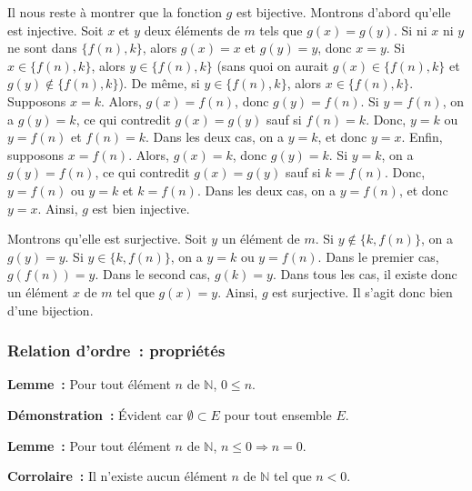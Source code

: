     Il nous reste à montrer que la fonction $g$ est bijective. 
    Montrons d'abord qu'elle est injective. 
    Soit $x$ et $y$ deux éléments de $m$ tels que $g(x) = g(y)$.
    Si ni $x$ ni $y$ ne sont dans $\lbrace f(n), k \rbrace$, alors $g(x) = x$ et $g(y) = y$, donc $x=y$. 
    Si $x \in \lbrace f(n), k \rbrace$, alors $y \in \lbrace f(n), k \rbrace$ (sans quoi on aurait $g(x) \in \lbrace f(n), k \rbrace$ et $g(y) \notin \lbrace f(n), k \rbrace$). 
    De même, si $y \in \lbrace f(n), k \rbrace$, alors $x \in \lbrace f(n), k \rbrace$. 
    Supposons $x = k$. 
    Alors, $g(x) = f(n)$, donc $g(y) = f(n)$. 
    Si $y = f(n)$, on a $g(y) = k$, ce qui contredit $g(x) = g(y)$ sauf si $f(n) = k$. 
    Donc, $y = k$ ou $y = f(n)$ et $f(n) = k$. 
    Dans les deux cas, on a $y = k$, et donc $y = x$. 
    Enfin, supposons $x = f(n)$. 
    Alors, $g(x) = k$, donc $g(y) = k$. 
    Si $y = k$, on a $g(y) = f(n)$, ce qui contredit $g(x) = g(y)$ sauf si $k = f(n)$. 
    Donc, $y = f(n)$ ou $y = k$ et $k = f(n)$. 
    Dans les deux cas, on a $y = f(n)$, et donc $y = x$. 
    Ainsi, $g$ est bien injective. 

    Montrons qu'elle est surjective. 
    Soit $y$ un élément de $m$. 
    Si $y \notin \lbrace k, f(n) \rbrace$, on a $g(y) = y$. 
    Si $y \in \lbrace k, f(n) \rbrace$, on a $y = k$ ou $y = f(n)$. 
    Dans le premier cas, $g(f(n)) = y$. 
    Dans le second cas, $g(k) = y$. 
    Dans tous les cas, il existe donc un élément $x$ de $m$ tel que $g(x) = y$. 
    Ainsi, $g$ est surjective. 
    Il s'agit donc bien d'une bijection. 

   \done 

\subsubsection{Relation d'ordre : propriétés}
\label{subsub:relOrdreProps}

\noindent\textbf{Lemme :} Pour tout élément $n$ de $\mathbb{N}$, $0 \leq n$.

\medskip

\noindent\textbf{Démonstration :} Évident car $\emptyset \subset E$ pour tout ensemble $E$. 

   \done 

\noindent\textbf{Lemme :} Pour tout élément $n$ de $\mathbb{N}$, $n \leq 0 \Rightarrow n = 0$.

\medskip

\noindent\textbf{Corrolaire :} Il n'existe aucun élément $n$ de $\mathbb{N}$ tel que $n < 0$.

